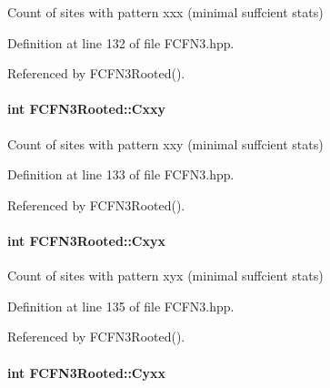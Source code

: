 \-Count of sites with pattern xxx (minimal suffcient stats) 



\-Definition at line 132 of file \-F\-C\-F\-N3.\-hpp.



\-Referenced by \-F\-C\-F\-N3\-Rooted().

\hypertarget{classFCFN3Rooted_a0e5c7aed5b6d0a32f31f6256d667bb94}{
\paragraph[{\-Cxxy}]{\setlength{\rightskip}{0pt plus 5cm}int {\bf \-F\-C\-F\-N3\-Rooted\-::\-Cxxy}}}\label{classFCFN3Rooted_a0e5c7aed5b6d0a32f31f6256d667bb94}


\-Count of sites with pattern xxy (minimal suffcient stats) 



\-Definition at line 133 of file \-F\-C\-F\-N3.\-hpp.



\-Referenced by \-F\-C\-F\-N3\-Rooted().

\hypertarget{classFCFN3Rooted_afa52426ba2915fa90e85fd870a99936b}{
\paragraph[{\-Cxyx}]{\setlength{\rightskip}{0pt plus 5cm}int {\bf \-F\-C\-F\-N3\-Rooted\-::\-Cxyx}}}\label{classFCFN3Rooted_afa52426ba2915fa90e85fd870a99936b}


\-Count of sites with pattern xyx (minimal suffcient stats) 



\-Definition at line 135 of file \-F\-C\-F\-N3.\-hpp.



\-Referenced by \-F\-C\-F\-N3\-Rooted().

\hypertarget{classFCFN3Rooted_aafa3f819584022c0bdae373df692dbef}{
\paragraph[{\-Cyxx}]{\setlength{\rightskip}{0pt plus 5cm}int {\bf \-F\-C\-F\-N3\-Rooted\-::\-Cyxx}}}\label{classFCFN3Rooted_aafa3f819584022c0bdae373df692dbef}


